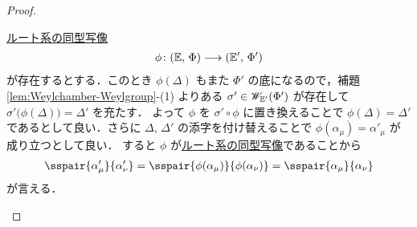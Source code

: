 \documentclass[rep_main]{subfiles}
\begin{document}
\begin{proof}
\begin{description}
		\hyperref[def:isom-root]{ルート系の同型写像}
		\begin{align}
			\phi \colon (\mathbb{E},\, \Phi) \longrightarrow (\mathbb{E}',\, \Phi')
		\end{align}
		が存在するとする．このとき $\phi(\Delta)$ もまた $\Phi'$ の底になるので，補題\ref{lem:Weylchamber-Weylgroup}-(1) よりある $\sigma' \in \mathscr{W}_{\mathbb{E}'}(\Phi')$ が存在して $\sigma' \bigl( \phi(\Delta)\bigr) = \Delta'$ を充たす．
		よって $\phi$ を $\sigma' \circ \phi$ に置き換えることで $\phi(\Delta) = \Delta'$ であるとして良い．さらに $\Delta,\, \Delta'$ の添字を付け替えることで $\phi (\alpha_\mu) = \alpha'_\mu$ が成り立つとして良い．
		すると $\phi$ が\hyperref[def:isom-root]{ルート系の同型写像}であることから
		\begin{align}
			\sspair{\alpha'_\mu}{\alpha'_\nu} = \sspair{\phi(\alpha_\mu)}{\phi(\alpha_\nu)} = \sspair{\alpha_\mu}{\alpha_\nu}
		\end{align}
		が言える．
	\end{description}
\end{proof}
\end{document}
